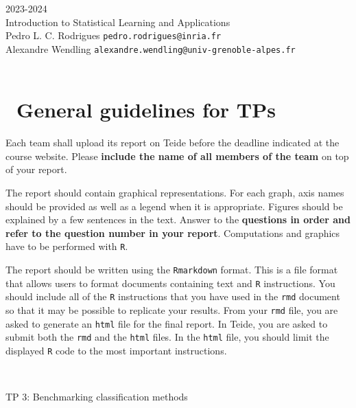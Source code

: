 \begin{flushleft}
 \hfill {} 2023-2024 \\
Introduction to Statistical Learning and Applications \\
Pedro L. C. Rodrigues   \hfill  \texttt{pedro.rodrigues@inria.fr} \\
Alexandre Wendling \hfill \texttt{alexandre.wendling@univ-grenoble-alpes.fr} \\

\HRuleTop\\

\section*{\faExclamationTriangle~General guidelines for TPs}

Each team shall upload its report on Teide before the deadline indicated at the course website. Please \textbf{include the name of all members of the team} on top of your report. 

The report should contain graphical representations. For each graph, axis names should be provided as well as a legend when it is appropriate. Figures should be explained by a few sentences in the text. Answer to the \textbf{questions in order and refer to the question number in your report}. Computations and graphics have to be performed with \texttt{R}.

The report should be written using the \texttt{Rmarkdown} format. This is a file format that allows users to format documents containing text and \texttt{R} instructions. You should include all of the \texttt{R} instructions that you have used in the \texttt{rmd} document so that it may be possible to replicate your results. From your \texttt{rmd} file, you are asked to generate an \texttt{html} file for the final report. In Teide, you are asked to submit both the \texttt{rmd} and the \texttt{html} files. In the \texttt{html} file, you should limit the displayed \texttt{R} code to the most important instructions.

\HRuleTop\\
\begin{center}
\Large{TP 3: Benchmarking classification methods}
\end{center}
\HRuleBottom
\end{flushleft}
